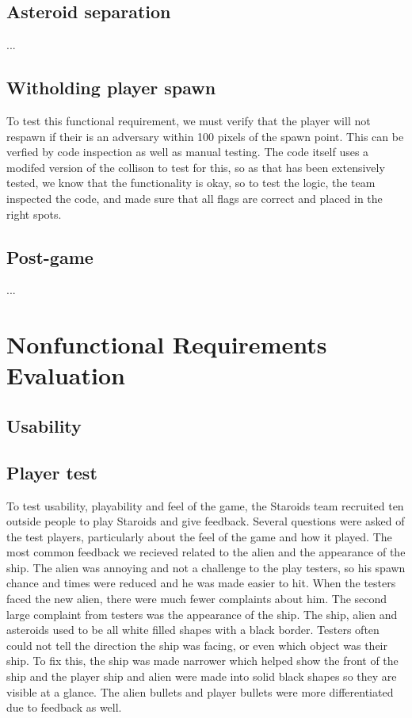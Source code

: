\documentclass[12pt, titlepage]{article}
\begin{document}
\subsection{Asteroid separation}
...\\
\subsection{Witholding player spawn}
To test this functional requirement, we must verify that the player will not respawn if their is an adversary within 100 pixels of the spawn point. This can be verfied by code inspection as well as manual testing. The code itself uses a modifed version of the collison to test for this, so as that has been extensively tested, we know that the functionality is okay, so to test the logic, the team inspected the code, and made sure that all flags are correct and placed in the right spots.
\subsection{Post-game}
...\\



\section{Nonfunctional Requirements Evaluation}

\subsection{Usability}

\subsection{Player test}
To test usability, playability and feel of the game, the Staroids team recruited ten outside people to play Staroids and give feedback. Several questions were asked of the test players, particularly about the feel of the game and how it played. The most common feedback we recieved related to the alien and the appearance of the ship. The alien was annoying and not a challenge to the play testers, so his spawn chance and times were reduced and he was made easier to hit. When the testers faced the new alien, there were much fewer complaints about him. The second large complaint from testers was the appearance of the ship. The ship, alien and asteroids used to be all white filled shapes with a black border. Testers often could not tell the direction the ship was facing, or even which object was their ship. To fix this, the ship was made narrower which helped show the front of the ship and the player ship and alien were made into solid black shapes so they are visible at a glance. The alien bullets and player bullets were more differentiated due to feedback as well.\\
\end{document}
